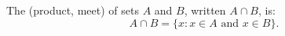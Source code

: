 The  (product, meet) of sets $A$ and $B$, written $A \cap B$, is:
$$
A \cap B = \{x : x \in A \text{ and } x \in B\}.
$$
